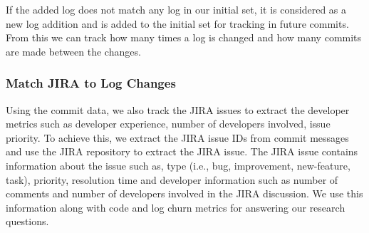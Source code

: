 If the added log does not match any log in our initial set, it is considered as a new log addition and is added to the initial set for tracking in future commits. From this we can track how many times a log is changed and how many commits are made between the changes. 


\subsubsection{Match JIRA to Log Changes}

Using the commit data, we also track the JIRA issues to extract the developer metrics such as developer experience, number of developers involved, issue priority. To achieve this, we extract the JIRA issue IDs from commit messages and use the JIRA repository to extract the JIRA issue. The JIRA issue contains information about the issue such as, type (i.e., bug, improvement, new-feature, task), priority, resolution time and developer information such as number of comments and number of developers involved in the JIRA discussion. We use this information along with code and log churn metrics for answering our research questions. 




 







